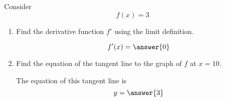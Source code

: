 \documentclass{ximera}
\author{Steven Gubkin}
\begin{document}
\begin{exercise}




Consider 
\[
f(x) = 3
\]



\begin{enumerate}
\item Find the derivative function $f'$ using the limit definition.
\begin{prompt} 
\[
f'(x) = \answer{0}
\]
\end{prompt}

\item  Find the equation of the tangent line to the graph of $f$ at $x=10$.

\begin{prompt} 
The equation of this tangent line is
$$ y = \answer{3}$$ 
\end{prompt}

\end{enumerate}

\end{exercise}
\end{document}
